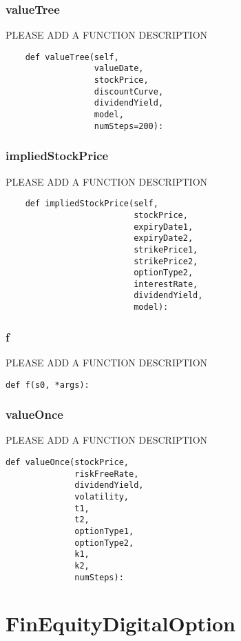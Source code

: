 \documentclass[twoside,11pt]{book}
\begin{document}
\subsubsection*{{\bf valueTree}}
PLEASE ADD A FUNCTION DESCRIPTION

\begin{lstlisting}
    def valueTree(self,
                  valueDate,
                  stockPrice,
                  discountCurve,
                  dividendYield,
                  model,
                  numSteps=200):
\end{lstlisting}

\subsubsection*{{\bf impliedStockPrice}}
PLEASE ADD A FUNCTION DESCRIPTION

\begin{lstlisting}
    def impliedStockPrice(self,
                          stockPrice,
                          expiryDate1,
                          expiryDate2,
                          strikePrice1,
                          strikePrice2,
                          optionType2,
                          interestRate,
                          dividendYield,
                          model):
\end{lstlisting}

\subsubsection*{{\bf f}}
PLEASE ADD A FUNCTION DESCRIPTION

\begin{lstlisting}
def f(s0, *args):
\end{lstlisting}

\subsubsection*{{\bf valueOnce}}
PLEASE ADD A FUNCTION DESCRIPTION

\begin{lstlisting}
def valueOnce(stockPrice,
              riskFreeRate,
              dividendYield,
              volatility,
              t1,
              t2,
              optionType1,
              optionType2,
              k1,
              k2,
              numSteps):
\end{lstlisting}

\newpage
\section{FinEquityDigitalOption}
\end{document}
